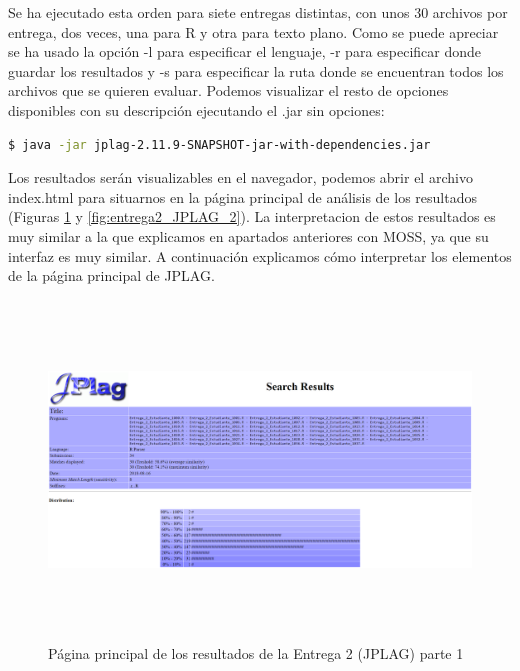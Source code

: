 Se ha ejecutado esta orden para siete entregas distintas, con unos 30 archivos por entrega, dos veces, una para R y otra para texto plano.
\newline
Como se puede apreciar se ha usado la opción -l para especificar el lenguaje, -r para especificar donde guardar los resultados y -s para especificar la ruta donde se encuentran todos los archivos que se quieren evaluar.
Podemos visualizar el resto de opciones disponibles con su descripción ejecutando el .jar sin opciones:
\begin{center}
\begin{lstlisting}[language=bash]
$ java -jar jplag-2.11.9-SNAPSHOT-jar-with-dependencies.jar
\end{lstlisting}
\end{center}

Los resultados serán visualizables en el navegador, podemos abrir el archivo index.html para situarnos en la página principal de análisis de los resultados (Figuras \ref{fig:entrega2_JPLAG_1} y \ref{fig:entrega2_JPLAG_2}).
La interpretacion de estos resultados es muy similar a la que explicamos en apartados anteriores con MOSS, ya que su interfaz es muy similar.
\newline
A continuación explicamos cómo interpretar los elementos de la página principal de JPLAG.
\begin{figure}[t] %
\centering
\includegraphics[width=14cm, height=9cm]{imagenes/entrega2_JPLAG_1.png}  %
\caption{Página principal de los resultados de la Entrega 2 (JPLAG) parte 1} \label{fig:entrega2_JPLAG_1}
\end{figure}

